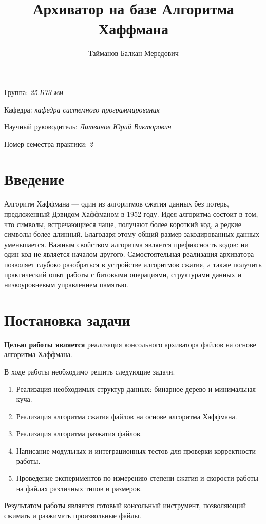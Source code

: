 \documentclass[a4paper]{article}
\title{Архиватор на базе Алгоритма Хаффмана}
\author{Тайманов Балкан Мередович}
\date{}
\begin{document}
\sloppy
\maketitle

\begin{flushright}
    Группа: \emph{25.Б73-мм}

    Кафедра: \emph{кафедра системного программирования}

    Научный руководитель: \emph{Литвинов Юрий Викторович}
    
    Номер семестра практики: \emph{2}
\end{flushright} 

\section{Введение}

Алгоритм Хаффмана --- один из алгоритмов сжатия данных без потерь, предложенный Дэвидом Хаффманом в 1952 году. Идея алгоритма состоит в том, что символы, встречающиеся чаще, получают более короткий код, а редкие символы более длинный. Благодаря этому общий размер закодированных данных уменьшается. Важным свойством алгоритма является префиксность кодов: ни один код не является началом другого.
Самостоятельная реализация архиватора позволяет глубоко разобраться в устройстве алгоритмов сжатия, а также получить практический опыт работы с битовыми операциями, структурами данных и низкоуровневым управлением памятью.

\section{Постановка задачи}

\textbf{Целью работы является} реализация консольного архиватора файлов на основе алгоритма Хаффмана.

В ходе работы необходимо решить следующие задачи.

\begin{enumerate}
    \item Реализация необходимых структур данных: бинарное дерево и минимальная куча.
    \item Реализация алгоритма сжатия файлов на основе алгоритма Хаффмана.
    \item Реализация алгоритма разжатия файлов.
    \item Написание модульных и интеграционных тестов для проверки корректности работы.
    \item Проведение экспериментов по измерению степени сжатия и скорости работы на файлах различных типов и размеров.
\end{enumerate}
Результатом работы является готовый консольный инструмент, позволяющий сжимать и разжимать произвольные файлы.
\end{document}
